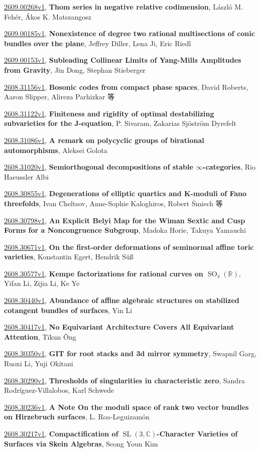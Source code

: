 \documentclass[9pt, a4paper]{article}
\theoremstyle{plain}
\theoremstyle{definition}
\theoremstyle{remark}
\newcommand{\arxiv}[3]{\href{https://arxiv.org/abs/#1}{#1}, \textbf{\textcolor{arxivblue}{#2}}, #3}
\begin{document}
\arxiv{2609.00268v1}{Thom series in negative relative codimension}{László M. Fehér, Ákos K. Matszangosz}

\arxiv{2609.00185v1}{Nonexistence of degree two rational multisections of conic bundles over the plane}{Jeffrey Diller, Lena Ji, Eric Riedl}

\arxiv{2609.00153v1}{Subleading Collinear Limits of Yang-Mills Amplitudes from Gravity}{Jin Dong, Stephan Stieberger}

\arxiv{2608.31156v1}{Bosonic codes from compact phase spaces}{David Roberts, Aaron Slipper, Alireza Parhizkar 等}

\arxiv{2608.31122v1}{Finiteness and rigidity of optimal destabilizing subvarieties for the J-equation}{P. Sivaram, Zakarias Sjöström Dyrefelt}

\arxiv{2608.31086v1}{A remark on polycyclic groups of birational automorphisms}{Aleksei Golota}

\arxiv{2608.31020v1}{Semiorthogonal decompositions of stable $\infty$-categories}{Rio Haeussler Albi}

\arxiv{2608.30855v1}{Degenerations of elliptic quartics and K-moduli of Fano threefolds}{Ivan Cheltsov, Anne-Sophie Kaloghiros, Robert Śmiech 等}

\arxiv{2608.30798v1}{An Explicit Belyi Map for the Wiman Sextic and Cusp Forms for a Noncongruence Subgroup}{Madoka Horie, Takuya Yamauchi}

\arxiv{2608.30671v1}{On the first-order deformations of seminormal affine toric varieties}{Konstantin Egert, Hendrik Süß}

\arxiv{2608.30577v1}{Kempe factorizations for rational curves on $\operatorname{SO}_4(\mathbb{R})$}{Yifan Li, Zijia Li, Ke Ye}

\arxiv{2608.30440v1}{Abundance of affine algebraic structures on stabilized cotangent bundles of surfaces}{Yin Li}

\arxiv{2608.30417v1}{No Equivariant Architecture Covers All Equivariant Attention}{Tīkun Ông}

\arxiv{2608.30350v1}{GIT for root stacks and 3d mirror symmetry}{Swapnil Garg, Ruoxi Li, Yuji Okitani}

\arxiv{2608.30290v1}{Thresholds of singularities in characteristic zero}{Sandra Rodríguez-Villalobos, Karl Schwede}

\arxiv{2608.30236v1}{A Note On the moduli space of rank two vector bundles on Hirzebruch surfaces}{L. Roa-Leguizamón}

\arxiv{2608.30217v1}{Compactification of $\operatorname{SL}(3,\mathbb{C})$-Character Varieties of Surfaces via Skein Algebras}{Seong Youn Kim}
\end{document}
